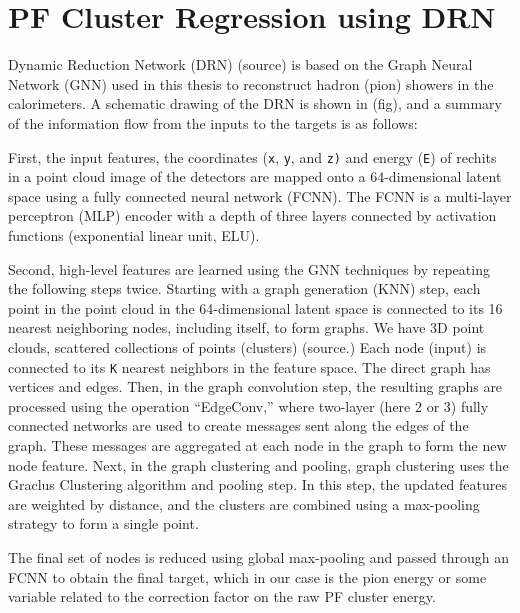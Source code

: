 \section{PF Cluster Regression using DRN}
Dynamic Reduction Network (DRN) (source) is based on the Graph Neural Network (GNN) used in this thesis to reconstruct hadron (pion) showers in the calorimeters.
A schematic drawing of the DRN is shown in (fig), and a summary of the information flow from the inputs to the targets is as follows:

First, the input features, the coordinates ({\tt x}, {\tt y}, and {\tt z)} and energy ({\tt E}) of rechits in a point cloud image of the detectors are mapped onto a 64-dimensional latent space using a fully connected neural network (FCNN).
The FCNN is a multi-layer perceptron (MLP) encoder with a depth of three layers connected by activation functions (exponential linear unit, ELU).

Second, high-level features are learned using the GNN techniques by repeating the following steps twice.
Starting with a graph generation (KNN) step, each point in the point cloud in the 64-dimensional latent space is connected to its 16 nearest neighboring nodes, including itself, to form graphs.
We have 3D point clouds, scattered collections of points (clusters) (source.)
Each node (input) is connected to its {\tt K} nearest neighbors in the feature space. The direct graph has vertices and edges. %
Then, in the graph convolution step, the resulting graphs are processed using the operation “EdgeConv,” where two-layer (here 2 or 3) fully connected networks are used to create messages sent along the edges of the graph.
These messages are aggregated at each node in the graph to form the new node feature. %
Next, in the graph clustering and pooling, graph clustering uses the Graclus Clustering algorithm and pooling step.
In this step, the updated features are weighted by distance, and the clusters are combined using a max-pooling strategy to form a single point.

The final set of nodes is reduced using global max-pooling and passed through an FCNN to obtain the final target, which in our case is the pion energy or some variable related to the correction factor on the raw PF cluster energy.

